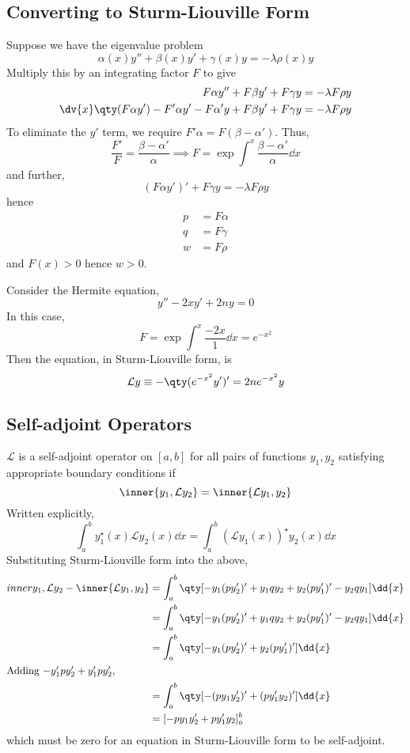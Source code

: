 \subsection{Converting to Sturm-Liouville Form}
Suppose we have the eigenvalue problem
\[ \alpha(x) y'' + \beta(x) y' + \gamma(x) y = -\lambda \rho(x) y \]
Multiply this by an integrating factor \( F \) to give
\begin{align*}
    F \alpha y'' + F \beta y' + F \gamma y &= -\lambda F \rho y \\
    \dv{x} \qty(F \alpha y') - F' \alpha y' - F \alpha' y + F \beta y' + F \gamma y &= -\lambda F \rho y
\end{align*}
To eliminate the \( y' \) term, we require \( F'\alpha = F(\beta - \alpha') \).
Thus,
\[ \frac{F'}{F} = \frac{\beta - \alpha'}{\alpha} \implies F = \exp \int^x \frac{\beta - \alpha'}{\alpha} \dd{x} \]
and further,
\[ (F\alpha y')' + F \gamma y = - \lambda F \rho y \]
hence
\begin{align*}
    p &= F \alpha \\
    q &= F \gamma \\
    w &= F \rho
\end{align*}
and \( F(x) > 0 \) hence \( w > 0 \).
\begin{example}
    Consider the Hermite equation,
    \[ y'' - 2xy' + 2ny = 0 \]
    In this case,
    \[ F = \exp \int^x \frac{-2x}{1} \dd{x} = e^{-x^2} \]
    Then the equation, in Sturm-Liouville form, is
    \[ \mathcal L y \equiv -\qty(e^{-x^2} y')' = 2n e^{-x^2} y \]
\end{example}

\subsection{Self-adjoint Operators}
\( \mathcal L \) is a self-adjoint operator on \( [a,b] \) for all pairs of functions \( y_1,y_2 \) satisfying appropriate boundary conditions if
\[ \inner{y_1, \mathcal L y_2} = \inner{\mathcal L y_1, y_2} \]
Written explicitly,
\[ \int_a^b y_1^\star(x) \mathcal L y_2(x) \dd{x} = \int_a^b (\mathcal L y_1(x))^\star y_2(x) \dd{x} \]
Substituting Sturm-Liouville form into the above,
\begin{align*}
    inner{y_1, \mathcal L y_2} - \inner{\mathcal L y_1, y_2} &= \int_a^b \qty[-y_1 (py_2')' + y_1 q y_2 + y_2 (p y_1')' - y_2 q y_1] \dd{x} \\
    &= \int_a^b \qty[-y_1 (py_2')' + y_1 q y_2 + y_2 (p y_1')' - y_2 q y_1] \dd{x} \\
    &= \int_a^b \qty[-y_1 (py_2')' + y_2 (p y_1')'] \dd{x} \\
    \intertext{Adding \( -y_1' p y_2' + y_1' p y_2' \),}
    &= \int_a^b \qty[-(py_1y_2')' + (py_1'y_2)'] \dd{x} \\
    &= [-py_1y_2' + py_1'y_2]_a^b
\end{align*}
which must be zero for an equation in Sturm-Liouville form to be self-adjoint.

